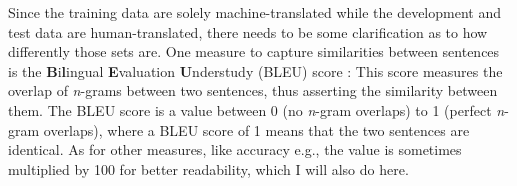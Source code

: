Since the training data are solely machine-translated while the development and test data
are human-translated, there needs to be some clarification as to how differently those sets
are. One measure to capture similarities between sentences is the \textbf{B}i\textbf{l}ingual
\textbf{E}valuation \textbf{U}nderstudy (BLEU) score \cite{papineni2002bleu}: This score
measures the overlap of \textit{n}-grams between two sentences, thus asserting the similarity
between them. The BLEU score is a value between 0 (no \textit{n}-gram overlaps) to 1 (perfect
\textit{n}-gram overlaps), where a BLEU score of 1 means that the two sentences are identical.
As for other measures, like accuracy e.g., the value is sometimes multiplied by 100 for better
readability, which I will also do here.



